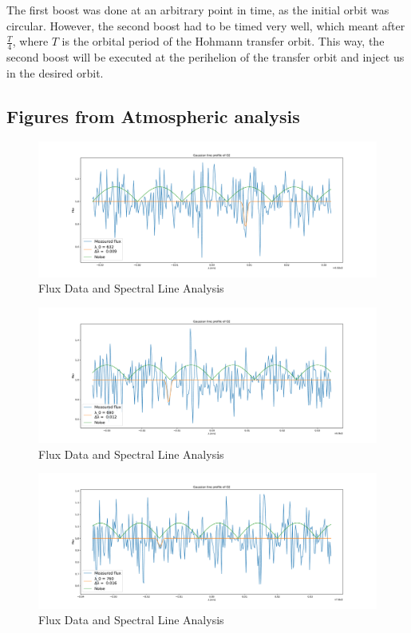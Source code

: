 \documentclass[reprint,english,notitlepage]{revtex4-2}
\begin{document}
    The first boost was done at an arbitrary point in time, as the initial orbit was circular.
    However, the second boost had to be timed very well, which meant after $\frac{T}{4}$, where $T$ is the orbital period of the Hohmann transfer orbit.
    This way, the second boost will be executed at the perihelion of the transfer orbit and inject us in the desired orbit.


\onecolumngrid
\clearpage
\subsection{Figures from Atmospheric analysis}\label{subsec:figures-atmospheric-analysis}
    \begin{figure}[h!]
        \centering
        \includegraphics[scale =.3]{Figures/O2 632}
        \caption{Flux Data and Spectral Line Analysis}
        \label{fig: O2 632}
    \end{figure}

    \begin{figure}[h!]
        \centering
        \includegraphics[scale =.3]{Figures/O2 690}
        \caption{Flux Data and Spectral Line Analysis}
        \label{fig: O2 690}
    \end{figure}

    \begin{figure}[h!]
      \centering
      \includegraphics[scale =.3]{Figures/O2 760}
      \caption{Flux Data and Spectral Line Analysis}
      \label{fig: O2 760}
    \end{figure}
\end{document}

